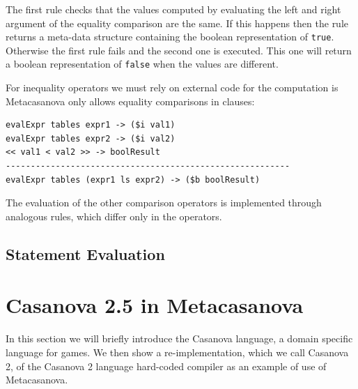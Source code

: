 \noindent
The first rule checks that the values computed by evaluating the left and right argument of the equality comparison are the same. If this happens then the rule returns a meta-data structure containing the boolean representation of \texttt{true}. Otherwise the first rule fails and the second one is executed. This one will return a boolean representation of \texttt{false} when the values are different.

For inequality operators we must rely on external code for the computation is Metacasanova only allows equality comparisons in clauses:

\begin{lstlisting}
evalExpr tables expr1 -> ($i val1)
evalExpr tables expr2 -> ($i val2)
<< val1 < val2 >> -> boolResult
---------------------------------------------------------
evalExpr tables (expr1 ls expr2) -> ($b boolResult)
\end{lstlisting}

\noindent
The evaluation of the other comparison operators is implemented through analogous rules, which differ only in the operators.

\subsection{Statement Evaluation}

\section{Casanova 2.5 in Metacasanova}
In this section we will briefly introduce the Casanova language, a domain specific language for games. We then show a re-implementation, which we call Casanova 2, of the Casanova 2 language hard-coded compiler as an example of use of Metacasanova.


